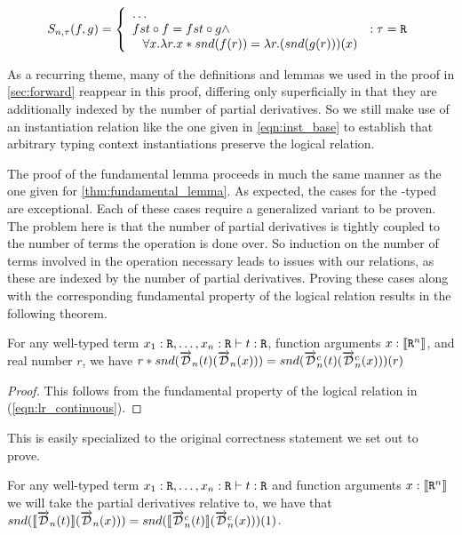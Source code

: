   \begin{equation}
    S_{n, \tau}(f, g) =
      \left\{
        \begin{array}{ll}
          \dots \\
          fst \circ f = fst \circ g \wedge
            & : \tau = \texttt{R} \\
          \;\;\;\forall x. \lambda r. x * snd(f(r)) = \lambda r. (snd(g(r)))(x)
        \end{array}
      \right.
  \label{eqn:lr_continuous}
  \end{equation}

  As a recurring theme, many of the definitions and lemmas we used in the proof in \cref{sec:forward} reappear in this proof, differing only superficially in that they are additionally indexed by the number of partial derivatives.
  So we still make use of an instantiation relation like the one given in \cref{eqn:inst_base} to establish that arbitrary typing context instantiations preserve the logical relation.

  The proof of the fundamental lemma proceeds in much the same manner as the one given for \cref{thm:fundamental_lemma}.
  As expected, the cases for the \synR-typed are exceptional.
  Each of these cases require a generalized variant to be proven.
  The problem here is that the number of partial derivatives is tightly coupled to the number of terms the operation is done over.
  So induction on the number of terms involved in the operation necessary leads to issues with our relations, as these are indexed by the number of partial derivatives.
  Proving these cases along with the corresponding fundamental property of the logical relation results in the following theorem.

  \begin{theorem}
    For any well-typed term $x_1 : \texttt{R}, \dots, x_n : \texttt{R} \vdash t : \texttt{R}$, function arguments $x : \llbracket \texttt{R}^n \rrbracket$, and real number $r$, we have $r * snd(\overrightarrow{\mathcal{D}}_n(t)(\overrightarrow{\mathcal{D}}_n(x))) = snd(\overrightarrow{\mathcal{D}}^c_n(t)(\overrightarrow{\mathcal{D}}^c_n(x)))(r)$
  \end{theorem}
  \begin{proof}
    This follows from the fundamental property of the logical relation in (\cref{eqn:lr_continuous}).
  \end{proof}

  This is easily specialized to the original correctness statement we set out to prove.
  \begin{corollary}
    For any well-typed term $x_1 : \texttt{R}, \dots, x_n : \texttt{R} \vdash t : \texttt{R}$ and function arguments $x : \llbracket \texttt{R}^n \rrbracket$ we will take the partial derivatives relative to, we have that $snd(\llbracket\overrightarrow{\mathcal{D}}_n(t)\rrbracket (\overrightarrow{\mathcal{D}}_n(x))) = snd(\llbracket\overrightarrow{\mathcal{D}}^c_n(t)\rrbracket (\overrightarrow{\mathcal{D}}^c_n(x)))(1)$.
  \end{corollary}
